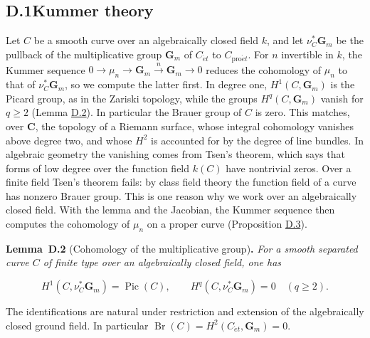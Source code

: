 \documentclass[11pt]{article}
\newenvironment{bpstatement}[2]{\par\addvspace{0.6\baselineskip}\noindent\textbf{#1}#2\textbf{.}\enspace\ignorespaces}
  {\par\addvspace{0.4\baselineskip}}
\newenvironment{bpstatementit}[2]{\begin{bpstatement}{#1}{#2}\itshape\ignorespaces}{\end{bpstatement}}
\begin{document}
\subsection*{\texorpdfstring{D.1\quad Kummer theory}{D.1 Kummer theory}}
\label{bp176}%
\label{bp177}%
Let \(C\) be a smooth curve over an algebraically closed field \(k\), and let \(\nu_C^*\mathbf G_m\) be the pullback of the multiplicative group \(\mathbf G_m\) of \(C_{\acute{e}t}\) to \(C_{\mathrm{pro}\acute{e}t}\). For \(n\) invertible in \(k\), the Kummer sequence \(0\to\mu_n\to\mathbf G_m\xrightarrow{n}\mathbf G_m\to0\) reduces the cohomology of \(\mu_n\) to that of \(\nu_C^*\mathbf G_m\), so we compute the latter first. In degree one, \(H^1(C,\mathbf G_m)\) is the Picard group, as in the Zariski topology, while the groups \(H^q(C,\mathbf G_m)\) vanish for \(q\ge2\) (Lemma \hyperref[bp178]{D.2}). In particular the Brauer group of \(C\) is zero. This matches, over \(\mathbf C\), the topology of a Riemann surface, whose integral cohomology vanishes above degree two, and whose \(H^2\) is accounted for by the degree of line bundles. In algebraic geometry the vanishing comes from Tsen's theorem, which says that forms of low degree over the function field \(k(C)\) have nontrivial zeros. Over a finite field Tsen's theorem fails: by class field theory the function field of a curve has nonzero Brauer group. This is one reason why we work over an algebraically closed field. With the lemma and the Jacobian, the Kummer sequence then computes the cohomology of \(\mu_n\) on a proper curve (Proposition \hyperref[bp181]{D.3}).

\label{bp178}%
\begin{bpstatementit}{Lemma~D.2}{ (Cohomology of the multiplicative group)}
For a smooth separated curve \(C\) of finite type over an algebraically closed field, one has

\[
H^1(C,\nu_C^*\mathbf G_m)=\operatorname{Pic}(C),
\qquad
H^q(C,\nu_C^*\mathbf G_m)=0\quad(q\geq2).
\]

The identifications are natural under restriction and extension of the algebraically closed ground field. In particular \(\operatorname{Br}(C)=H^2(C_{\acute{e}t},\mathbf G_m)=0\).
\end{bpstatementit}
\end{document}
